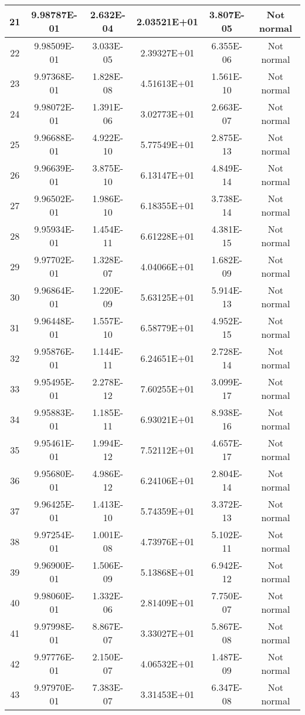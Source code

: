 \begin{table}[h]
\begin{tabular}{|c|c|c|c|c|c|}
		21 & 9.98787E-01 & 2.632E-04 & 2.03521E+01 & 3.807E-05 & Not normal\\\hline
		22 & 9.98509E-01 & 3.033E-05 & 2.39327E+01 & 6.355E-06 & Not normal\\\hline
		23 & 9.97368E-01 & 1.828E-08 & 4.51613E+01 & 1.561E-10 & Not normal\\\hline
		24 & 9.98072E-01 & 1.391E-06 & 3.02773E+01 & 2.663E-07 & Not normal\\\hline
		25 & 9.96688E-01 & 4.922E-10 & 5.77549E+01 & 2.875E-13 & Not normal\\\hline
		26 & 9.96639E-01 & 3.875E-10 & 6.13147E+01 & 4.849E-14 & Not normal\\\hline
		27 & 9.96502E-01 & 1.986E-10 & 6.18355E+01 & 3.738E-14 & Not normal\\\hline
		28 & 9.95934E-01 & 1.454E-11 & 6.61228E+01 & 4.381E-15 & Not normal\\\hline
		29 & 9.97702E-01 & 1.328E-07 & 4.04066E+01 & 1.682E-09 & Not normal\\\hline
		30 & 9.96864E-01 & 1.220E-09 & 5.63125E+01 & 5.914E-13 & Not normal\\\hline
		31 & 9.96448E-01 & 1.557E-10 & 6.58779E+01 & 4.952E-15 & Not normal\\\hline
		32 & 9.95876E-01 & 1.144E-11 & 6.24651E+01 & 2.728E-14 & Not normal\\\hline
		33 & 9.95495E-01 & 2.278E-12 & 7.60255E+01 & 3.099E-17 & Not normal\\\hline
		34 & 9.95883E-01 & 1.185E-11 & 6.93021E+01 & 8.938E-16 & Not normal\\\hline
		35 & 9.95461E-01 & 1.994E-12 & 7.52112E+01 & 4.657E-17 & Not normal\\\hline
		36 & 9.95680E-01 & 4.986E-12 & 6.24106E+01 & 2.804E-14 & Not normal\\\hline
		37 & 9.96425E-01 & 1.413E-10 & 5.74359E+01 & 3.372E-13 & Not normal\\\hline
		38 & 9.97254E-01 & 1.001E-08 & 4.73976E+01 & 5.102E-11 & Not normal\\\hline
		39 & 9.96900E-01 & 1.506E-09 & 5.13868E+01 & 6.942E-12 & Not normal\\\hline
		40 & 9.98060E-01 & 1.332E-06 & 2.81409E+01 & 7.750E-07 & Not normal\\\hline
		41 & 9.97998E-01 & 8.867E-07 & 3.33027E+01 & 5.867E-08 & Not normal\\\hline
		42 & 9.97776E-01 & 2.150E-07 & 4.06532E+01 & 1.487E-09 & Not normal\\\hline
		43 & 9.97970E-01 & 7.383E-07 & 3.31453E+01 & 6.347E-08 & Not normal\\\hline

\end{tabular}
\end{table}

